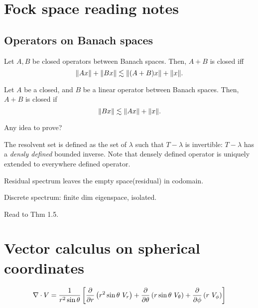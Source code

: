 \documentclass{article}
\let\realsection\section
\renewcommand\section{\newpage\realsection}
\begin{document}
\tableofcontents

\section{Fock space reading notes}
\subsection{Operators on Banach spaces}
\begin{thm}
Let $A,B$ be closed operators between Banach spaces.
Then, $A+B$ is closed iff
\[\|Ax\|+\|Bx\|\lesssim\|(A+B)x\|+\|x\|.\]
\end{thm}
\begin{thm}
Let $A$ be a closed, and $B$ be a linear operator between Banach spaces.
Then, $A+B$ is closed if
\[\|Bx\|\lesssim\|Ax\|+\|x\|.\]
\end{thm}
Any idea to prove?

The resolvent set is defined as the set of $\lambda$ such that $T-\lambda$ is invertible: $T-\lambda$ has a \emph{densly defined} bounded inverse.
Note that densely defined operator is uniquely extended to everywhere defined operator.

Residual spectrum leaves the empty space(residual) in codomain.

Discrete spectrum: finite dim eigenspace, isolated.

Read to Thm 1.5.

\section{Vector calculus on spherical coordinates}


\[
\del\cdot V=\frac1{r^2\sin\theta}\left[  \pd{r}\left(r^2\sin\theta\ V_r\right) + \pd{\theta}\left(r\sin\theta\ V_\theta\right) + \pd{\phi}\left(r\ V_\phi\right)  \right]
\]
\end{document}

